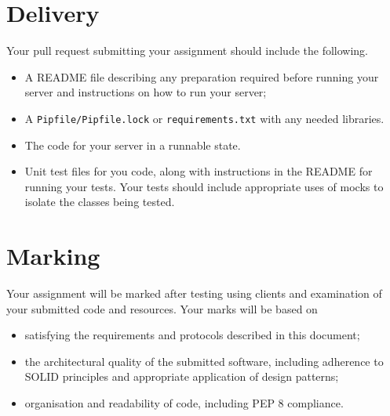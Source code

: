 \documentclass{article}
\begin{document}
\section{Delivery}
Your pull request submitting your assignment should include the following.

\begin{itemize}
  \item A README file describing any preparation required before running your server and instructions on how to run your server;
  \item A \texttt{Pipfile/Pipfile.lock} or \texttt{requirements.txt} with any needed libraries.
  \item The code for your server in a runnable state.
  \item Unit test files for you code, along with instructions in the README for running your tests. Your tests should include appropriate uses
  of mocks to isolate the classes being tested.
\end{itemize}

\section{Marking}
Your assignment will be marked after testing using clients and examination of your submitted code and resources. Your marks will be based on
\begin{itemize}
  \item satisfying the requirements and protocols described in this document;
  \item the architectural quality of the submitted software, including adherence to SOLID principles and appropriate application of design patterns;
  \item organisation and readability of code, including PEP 8 compliance.
\end{itemize}



         
\end{document}
